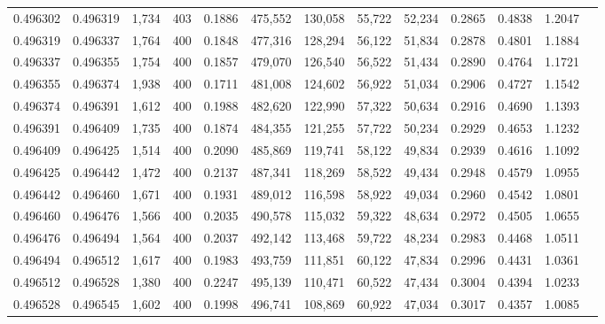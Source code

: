 \begin{tabular}{rrrrrrrrrrrrr}
0.496302 & 0.496319 &  1,734 & 403 &                                     0.1886 & 475,552 & 130,058 &  55,722 &  52,234 & 0.2865 & 0.4838 & 1.2047 \\
0.496319 & 0.496337 &  1,764 & 400 &                                     0.1848 & 477,316 & 128,294 &  56,122 &  51,834 & 0.2878 & 0.4801 & 1.1884 \\
0.496337 & 0.496355 &  1,754 & 400 &                                     0.1857 & 479,070 & 126,540 &  56,522 &  51,434 & 0.2890 & 0.4764 & 1.1721 \\
0.496355 & 0.496374 &  1,938 & 400 &                                     0.1711 & 481,008 & 124,602 &  56,922 &  51,034 & 0.2906 & 0.4727 & 1.1542 \\
0.496374 & 0.496391 &  1,612 & 400 &                                     0.1988 & 482,620 & 122,990 &  57,322 &  50,634 & 0.2916 & 0.4690 & 1.1393 \\
0.496391 & 0.496409 &  1,735 & 400 &                                     0.1874 & 484,355 & 121,255 &  57,722 &  50,234 & 0.2929 & 0.4653 & 1.1232 \\
0.496409 & 0.496425 &  1,514 & 400 &                                     0.2090 & 485,869 & 119,741 &  58,122 &  49,834 & 0.2939 & 0.4616 & 1.1092 \\
0.496425 & 0.496442 &  1,472 & 400 &                                     0.2137 & 487,341 & 118,269 &  58,522 &  49,434 & 0.2948 & 0.4579 & 1.0955 \\
0.496442 & 0.496460 &  1,671 & 400 &                                     0.1931 & 489,012 & 116,598 &  58,922 &  49,034 & 0.2960 & 0.4542 & 1.0801 \\
0.496460 & 0.496476 &  1,566 & 400 &                                     0.2035 & 490,578 & 115,032 &  59,322 &  48,634 & 0.2972 & 0.4505 & 1.0655 \\
0.496476 & 0.496494 &  1,564 & 400 &                                     0.2037 & 492,142 & 113,468 &  59,722 &  48,234 & 0.2983 & 0.4468 & 1.0511 \\
0.496494 & 0.496512 &  1,617 & 400 &                                     0.1983 & 493,759 & 111,851 &  60,122 &  47,834 & 0.2996 & 0.4431 & 1.0361 \\
0.496512 & 0.496528 &  1,380 & 400 &                                     0.2247 & 495,139 & 110,471 &  60,522 &  47,434 & 0.3004 & 0.4394 & 1.0233 \\
0.496528 & 0.496545 &  1,602 & 400 &                                     0.1998 & 496,741 & 108,869 &  60,922 &  47,034 & 0.3017 & 0.4357 & 1.0085 \\

\end{tabular}
